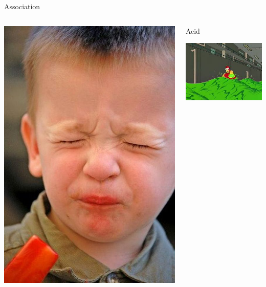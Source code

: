\documentclass[notes]{beamer}
\begin{document}
\begin{frame}{Association}
\begin{columns}
\begin{column}{0.3\textwidth}
		\includegraphics[width=\textwidth]{img/sour.jpg}
	\end{column} \pause
			\begin{column}{0.3\textwidth}
				\begin{center}
					Acid
				\end{center}
	\includegraphics[width=\textwidth]{img/acid.jpeg}
\end{column}
	\end{columns}
\end{frame}
\end{document}
